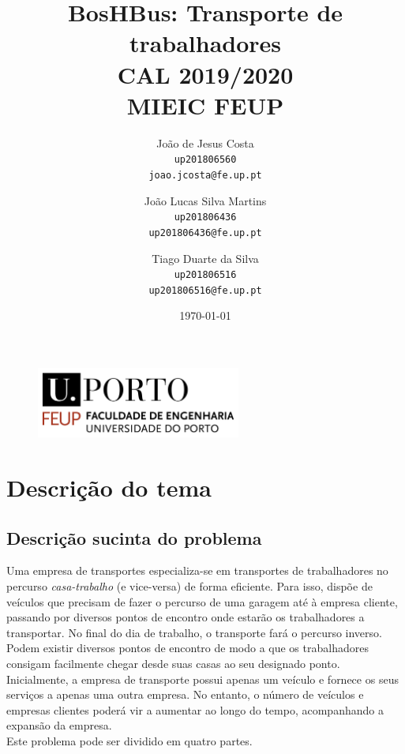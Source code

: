 \documentclass{report}
\begin{document}
\title{\huge{\textbf{BosHBus: Transporte de trabalhadores}} \\ CAL 2019/2020 \\ MIEIC FEUP}
  \author{João de Jesus Costa \\ \texttt{up201806560} \\ \texttt{joao.jcosta@fe.up.pt} \and
          João Lucas Silva Martins \\ \texttt{up201806436} \\ \texttt{up201806436@fe.up.pt} \and
          Tiago Duarte da Silva \\ \texttt{up201806516} \\ \texttt{up201806516@fe.up.pt}
          }
  \date{\today{}}

  \begin{figure}[b]
    \centering
      \includegraphics[width=0.6\textwidth]{img/feup_logo.png}
  \end{figure}
\maketitle{}

\tableofcontents{}
\newpage

\chapter{Descrição do tema}
  \section{Descrição sucinta do problema}
    Uma empresa de transportes especializa-se em transportes de trabalhadores no
    percurso \textit{casa-trabalho} (e vice-versa) de forma eficiente. Para isso,
    dispõe de veículos que precisam de fazer o percurso de uma garagem até à empresa
    cliente, passando por diversos pontos de encontro onde estarão os
    trabalhadores a transportar. No final do dia de trabalho, o transporte fará
    o percurso inverso.\\
    Podem existir diversos pontos de encontro de modo a que os trabalhadores
    consigam facilmente chegar desde suas casas ao seu designado ponto.\\
    Inicialmente, a empresa de transporte possui apenas um veículo e fornece os
    seus serviços a apenas uma outra empresa. No entanto, o número de veículos
    e empresas clientes poderá vir a aumentar ao longo do tempo, acompanhando a
    expansão da empresa.\\
    \newline
    Este problema pode ser dividido em quatro partes.
  
\end{document}
